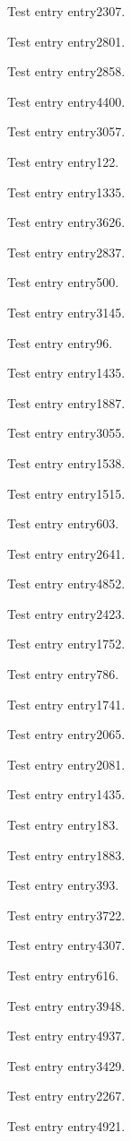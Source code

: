 Test entry \gls{entry2307}.

Test entry \gls{entry2801}.

Test entry \gls{entry2858}.

Test entry \gls{entry4400}.

Test entry \gls{entry3057}.

Test entry \gls{entry122}.

Test entry \gls{entry1335}.

Test entry \gls{entry3626}.

Test entry \gls{entry2837}.

Test entry \gls{entry500}.

Test entry \gls{entry3145}.

Test entry \gls{entry96}.

Test entry \gls{entry1435}.

Test entry \gls{entry1887}.

Test entry \gls{entry3055}.

Test entry \gls{entry1538}.

Test entry \gls{entry1515}.

Test entry \gls{entry603}.

Test entry \gls{entry2641}.

Test entry \gls{entry4852}.

Test entry \gls{entry2423}.

Test entry \gls{entry1752}.

Test entry \gls{entry786}.

Test entry \gls{entry1741}.

Test entry \gls{entry2065}.

Test entry \gls{entry2081}.

Test entry \gls{entry1435}.

Test entry \gls{entry183}.

Test entry \gls{entry1883}.

Test entry \gls{entry393}.

Test entry \gls{entry3722}.

Test entry \gls{entry4307}.

Test entry \gls{entry616}.

Test entry \gls{entry3948}.

Test entry \gls{entry4937}.

Test entry \gls{entry3429}.

Test entry \gls{entry2267}.

Test entry \gls{entry4921}.

